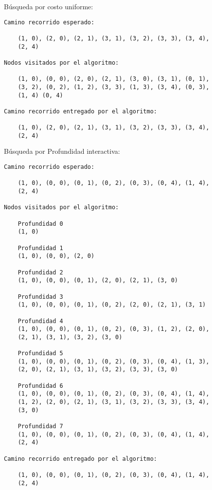 Búsqueda por costo uniforme:\\

\begin{lstlisting}[]
Camino recorrido esperado:

    (1, 0), (2, 0), (2, 1), (3, 1), (3, 2), (3, 3), (3, 4), 
    (2, 4)

Nodos visitados por el algoritmo:

    (1, 0), (0, 0), (2, 0), (2, 1), (3, 0), (3, 1), (0, 1),
    (3, 2), (0, 2), (1, 2), (3, 3), (1, 3), (3, 4), (0, 3),
    (1, 4) (0, 4)

Camino recorrido entregado por el algoritmo:
    
    (1, 0), (2, 0), (2, 1), (3, 1), (3, 2), (3, 3), (3, 4), 
    (2, 4)

\end{lstlisting}
\clearpage

Búsqueda por Profundidad interactiva:\\

\begin{lstlisting}[]
Camino recorrido esperado:

    (1, 0), (0, 0), (0, 1), (0, 2), (0, 3), (0, 4), (1, 4),
    (2, 4)

Nodos visitados por el algoritmo:

    Profundidad 0
    (1, 0)
    
    Profundidad 1
    (1, 0), (0, 0), (2, 0)

    Profundidad 2
    (1, 0), (0, 0), (0, 1), (2, 0), (2, 1), (3, 0)

    Profundidad 3
    (1, 0), (0, 0), (0, 1), (0, 2), (2, 0), (2, 1), (3, 1)

    Profundidad 4
    (1, 0), (0, 0), (0, 1), (0, 2), (0, 3), (1, 2), (2, 0),
    (2, 1), (3, 1), (3, 2), (3, 0)

    Profundidad 5
    (1, 0), (0, 0), (0, 1), (0, 2), (0, 3), (0, 4), (1, 3),
    (2, 0), (2, 1), (3, 1), (3, 2), (3, 3), (3, 0)
    
    Profundidad 6
    (1, 0), (0, 0), (0, 1), (0, 2), (0, 3), (0, 4), (1, 4),
    (1, 2), (2, 0), (2, 1), (3, 1), (3, 2), (3, 3), (3, 4),
    (3, 0)

    Profundidad 7
    (1, 0), (0, 0), (0, 1), (0, 2), (0, 3), (0, 4), (1, 4),
    (2, 4)

Camino recorrido entregado por el algoritmo:
    
    (1, 0), (0, 0), (0, 1), (0, 2), (0, 3), (0, 4), (1, 4),
    (2, 4)

\end{lstlisting}

\clearpage